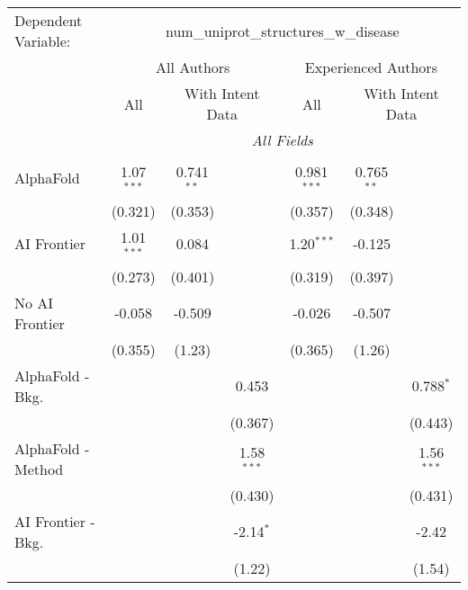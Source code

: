 \begingroup
\centering
\begin{tabular}{lcccccc}
   \tabularnewline \midrule \midrule
   Dependent Variable: & \multicolumn{6}{c}{num\_uniprot\_structures\_w\_disease}\\
 & \multicolumn{3}{c}{All Authors} & \multicolumn{3}{c}{Experienced Authors} \\
\cmidrule(lr){2-4} \cmidrule(lr){5-7}
 & \multicolumn{1}{c}{All} & \multicolumn{2}{c}{With Intent Data} & \multicolumn{1}{c}{All} & \multicolumn{2}{c}{With Intent Data} \\
\cmidrule(lr){2-2} \cmidrule(lr){3-4} \cmidrule(lr){5-5} \cmidrule(lr){6-7}
 & \multicolumn{6}{c}{\textit{All Fields}} \\ \\
   AlphaFold               & 1.07$^{***}$ & 0.741$^{**}$ &              & 0.981$^{***}$ & 0.765$^{**}$ &   \\   
                           & (0.321)      & (0.353)      &              & (0.357)       & (0.348)      &   \\   
   AI Frontier             & 1.01$^{***}$ & 0.084        &              & 1.20$^{***}$  & -0.125       &   \\   
                           & (0.273)      & (0.401)      &              & (0.319)       & (0.397)      &   \\   
   No AI Frontier          & -0.058       & -0.509       &              & -0.026        & -0.507       &   \\   
                           & (0.355)      & (1.23)       &              & (0.365)       & (1.26)       &   \\   
   AlphaFold - Bkg.        &              &              & 0.453        &               &              & 0.788$^{*}$\\   
                           &              &              & (0.367)      &               &              & (0.443)\\   
   AlphaFold - Method      &              &              & 1.58$^{***}$ &               &              & 1.56$^{***}$\\   
                           &              &              & (0.430)      &               &              & (0.431)\\   
   AI Frontier - Bkg.      &              &              & -2.14$^{*}$  &               &              & -2.42\\   
                           &              &              & (1.22)       &               &              & (1.54)\\   

\end{tabular}
